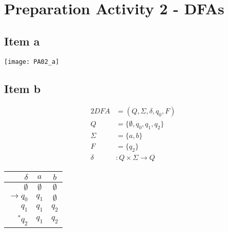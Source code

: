 \setcounter{section}{1}
\section{Preparation Activity 2 - DFAs}
{
\renewcommand{\thesubsection}{\thesection.\alph{subsection}}
\subsection{Item a}
\begin{center} \texttt{[image: PA02\_a]} \end{center}
\subsection{Item b}
\begin{center}
\begin{minipage}[c]{0.25\textwidth}
	\begin{alignat*}{2}
		DFA    &= (Q, \Sigma, \delta, q_0, F)\\
		Q      &= \{\emptyset,q_0,q_1,q_2\}\\
		\Sigma &= \{a,b\}\\
		F      &= \{q_2\}\\
		\delta &\colon Q \times \Sigma \rightarrow Q
	\end{alignat*}
\end{minipage}%
\begin{minipage}[c]{0.2\textwidth}
	\begin{center}
		\begin{tabular}{ r | c c }
 			$         \delta$ & $a  $ & $b  $ \\ \hline
			$            \emptyset$ & $\emptyset$ & $\emptyset$\\ 			
 			$\rightarrow q_0$ & $q_1$ & $\emptyset$ \\
 			$            q_1$ & $q_1$ & $q_2$ \\
 			$      ^\ast q_2$ & $q_1$ & $q_2$
		\end{tabular}
		\end{center}
\end{minipage}
\end{center}
}
